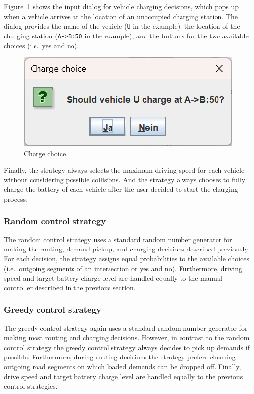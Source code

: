 \documentclass[10pt,twocolumn]{article}
\begin{document}
Figure~\ref{fig:manual-controller-charge} shows the input dialog for vehicle charging decisions, which pops up when a vehicle arrives at the location of an unoccupied charging station.
The dialog provides the name of the vehicle (\texttt{U} in the example), the location of the charging station (\texttt{A->B:50} in the example), and the buttons for the two available choices (i.e.\ yes and no).

\begin{figure}[!ht]
    \centering
    \includegraphics[scale=0.4]{../../screenshots/manual-controller-charge.png}
    \caption{Charge choice.}
    \label{fig:manual-controller-charge}
\end{figure}

Finally, the strategy always selects the maximum driving speed for each vehicle without considering possible collisions.
And the strategy always chooses to fully charge the battery of each vehicle after the user decided to start the charging process.

\subsubsection*{Random control strategy}
\label{sec:controller-random}

The random control strategy uses a standard random number generator for making the routing, demand pickup, and charging decisions described previously.
For each decision, the strategy assigns equal probabilities to the available choices (i.e.\ outgoing segments of an intersection or yes and no).
Furthermore, driving speed and target battery charge level are handled equally to the manual controller described in the previous section.

\subsubsection*{Greedy control strategy}
\label{sec:controller-greedy}

The greedy control strategy again uses a standard random number generator for making most routing and charging decisions.
However, in contrast to the random control strategy the greedy control strategy always decides to pick up demands if possible.
Furthermore, during routing decisions the strategy prefers choosing outgoing road segments on which loaded demands can be dropped off.
Finally, drive speed and target battery charge level are handled equally to the previous control strategies.
\end{document}

